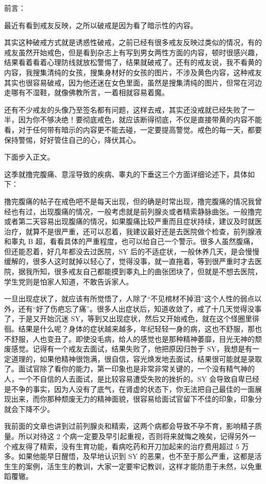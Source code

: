 \documentclass[fontset=founder]{ctexart}
\begin{document}
前言：

最近有看到戒友反映，之所以破戒是因为看了暗示性的内容。

其实这种破戒方式就是诱惑性破戒，之前已经有很多戒友反映过类似的情况，有的戒友虽然开始戒色，但是看到杂志上有写到男女两性方面的内容，顿时很感兴趣，结果看着看着心理防线就放松警惕了，结果就破戒了。还有的戒友说，我不看黄的内容，我搜集清纯的女孩，搜集身材好的女孩的图片，不涉及黄色内容，这种戒友其实也很容易破戒，因为他还迷在女色里面，虽然是搜集清纯的图片，但常在河边走哪有不湿鞋，就像佛教所言，一着相就容易着魔。

还有不少戒友的头像乃至签名都有问题，这样去戒，其实还没戒就已经失败了一半，因为你不够决绝！要彻底戒色，就应该断得彻底，不仅是直接带黄的内容不能看，对于任何带有暗示的内容更不能去碰，一定要提高警觉。戒色的每一天，都要保持警惕，好好管住自己的心，降伏其心。

下面步入正文。

这季就撸完腹痛、意淫导致的疾病、睾丸的下垂这三个方面详细论述下，具体如下：

撸完腹痛的帖子在戒色吧不是每天出现，但的确是时常出现，撸完腹痛的情况我曾经也有过，出现腹痛的情况，一般考虑就是前列腺炎或者精索静脉曲张。一般撸完或者第二天容易出现腹痛的情况，如果腹痛比较严重而且症状持续，建议及时就医治疗，就算不是很严重，还可以忍着，我建议最好还是去医院做个检查，前列腺液和睾丸 B 超，看看具体的严重程度，也可以给自己一个警示。很多人虽然腹痛，但还能忍着，好几年都没去过医院，SY 后的不适症状，一般休养几天，是会慢慢缓解的，很多人这时就掉以轻心了，觉得没事，就一直拖着，等到很严重时才去医院，据我所知，很多戒友自己都能摸到睾丸上的曲张团块了，但就是不想去医院，学生党则是怕家人知道，不敢告诉家人。

一旦出现症状了，就应该有所觉悟了，人除了“不见棺材不掉泪”这个人性的弱点以外，还有“好了伤疤忘了痛”。很多人出症状后，知道收敛了，戒了十几天觉得没事了，于是又开始沉迷 SY，等到又出现症状，然后又开始戒色，就在这个怪圈里徘徊。结果是什么呢？身体的症状越来越多，年纪轻轻一身的病，这也不舒服，那也不舒服，人也变丑了。即使没毛病，给人的感觉也是那种精神萎靡，目光无神的颓废感觉。记得有一个戒友去面试，结果失败了，他把原因归咎于 SY，我想是有一定道理的，如果他精神很饱满，很自信，容光焕发地去面试，结果很可能就是录取了。面试官除了看你的能力，第一印象也是非常非常关键的，一个没有精气神的人，一个不自信的人去面试，是比较容易遭受失败的挫折的。SY 会导致自卑已经是不争的事实，因为人没有了底气，在肾虚的状态下，你无法把自己最佳的一面展现出来，而你那种颓废无力的精神面貌，很容易给面试官留下不佳的印象，印象分就会下降不少。

我前面的文章也讲到过前列腺炎和精索，这两个病都会导致不孕不育，影响精子质量。所以对待这 2 个病一定要及早引起重视，否则将来就悔之晚矣，记得另外一个戒友得了精索，没有生育功能，看病吃药和开刀加起来的治疗费用超过 5 万多。如果他能早日醒悟，及早地认识到 SY 的恶果，也不至于那么严重，这都是活生生的案例，活生生的教训，大家一定要牢记教训，这样才能防患于未然，以免重蹈覆辙。
\end{document}
